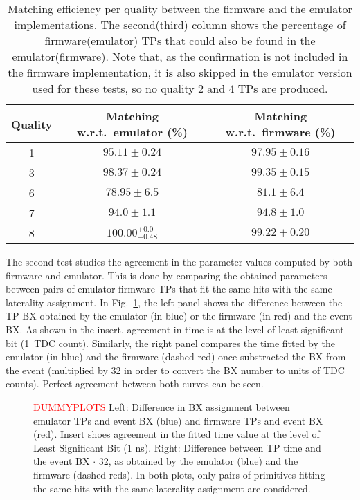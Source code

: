 \documentclass[../main.tex]{subfiles}
\begin{document}
\begin{table}[h!]
\begin{center}
\begin{tabular}{c | c | c}
Quality & Matching w.r.t.~emulator (\%) & Matching w.r.t.~firmware (\%) \\\hline
1 & $95.11 \pm 0.24$ & $97.95 \pm 0.16$ \\
3 & $98.37 \pm 0.24$ & $99.35 \pm 0.15$ \\ 
6 & $78.95 \pm 6.5$  & $81.1 \pm 6.4$   \\
7 & $94.0 \pm 1.1$   & $94.8 \pm 1.0$   \\
8 & $100.00 ^{+0.0}_{-0.48}$ & $99.22 \pm 0.20$
\end{tabular}
\caption{Matching efficiency per quality between the firmware and the emulator implementations. The second(third) column shows the percentage of firmware(emulator) TPs that could also be found in the emulator(firmware). Note that, as the confirmation is not included in the firmware implementation, it is also skipped in the emulator version used for these tests, so no quality 2 and 4 TPs are produced.}
\label{dts:tab:fwemu}
\end{center}
\end{table}

The second test studies the agreement in the parameter values computed by both firmware and emulator. This is done by comparing the obtained parameters between pairs of emulator-firmware TPs that fit the same hits with the same laterality assignment. In Fig.~\ref{dts:fig:fwemu_time}, the left panel shows the difference between the TP BX obtained by the emulator (in blue) or the firmware (in red) and the event BX. As shown in the insert, agreement in time is at the level of least significant bit (1~TDC count). Similarly, the right panel compares the time fitted by the emulator (in blue) and the firmware (dashed red) once substracted the BX from the event (multiplied by 32 in order to convert the BX number to units of TDC counts). Perfect agreement between both curves can be seen.


\begin{figure}
\begin{center}
\end{center}
\caption{\textcolor{red}{DUMMYPLOTS} Left: Difference in BX assignment between emulator TPs and event BX (blue) and firmware TPs and event BX (red). Insert shoes agreement in the fitted time value at the level of Least Significant Bit (1 ns). Right: Difference between TP time and the event BX $\cdot$ 32, as obtained by the emulator (blue) and the firmware (dashed reds). In both plots, only pairs of primitives fitting the same hits with the same laterality assignment are considered.}
\label{dts:fig:fwemu_time}
\end{figure}
\end{document}
